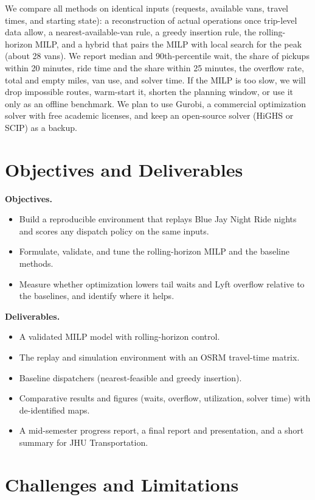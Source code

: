 \documentclass{article}
\begin{document}
We compare all methods on identical inputs (requests, available vans, travel times, and starting state): a reconstruction of actual operations once trip-level data allow, a nearest-available-van rule, a greedy insertion rule, the rolling-horizon MILP, and a hybrid that pairs the MILP with local search for the peak (about 28 vans). We report median and 90th-percentile wait, the share of pickups within 20 minutes, ride time and the share within 25 minutes, the overflow rate, total and empty miles, van use, and solver time. If the MILP is too slow, we will drop impossible routes, warm-start it, shorten the planning window, or use it only as an offline benchmark. We plan to use Gurobi, a commercial optimization solver with free academic licenses, and keep an open-source solver (HiGHS or SCIP) as a backup.

\vskip -0.1in
\section{Objectives and Deliverables}
\vskip -0.1in

\textbf{Objectives.}
\begin{itemize}\setlength\itemsep{1pt}
\item Build a reproducible environment that replays Blue Jay Night Ride nights and scores any dispatch policy on the same inputs.
\item Formulate, validate, and tune the rolling-horizon MILP and the baseline methods.
\item Measure whether optimization lowers tail waits and Lyft overflow relative to the baselines, and identify where it helps.
\end{itemize}
\textbf{Deliverables.}
\begin{itemize}\setlength\itemsep{1pt}
\item A validated MILP model with rolling-horizon control.
\item The replay and simulation environment with an OSRM travel-time matrix.
\item Baseline dispatchers (nearest-feasible and greedy insertion).
\item Comparative results and figures (waits, overflow, utilization, solver time) with de-identified maps.
\item A mid-semester progress report, a final report and presentation, and a short summary for JHU Transportation.
\end{itemize}

\vskip -0.1in
\section{Challenges and Limitations}
\vskip -0.1in
\end{document}
